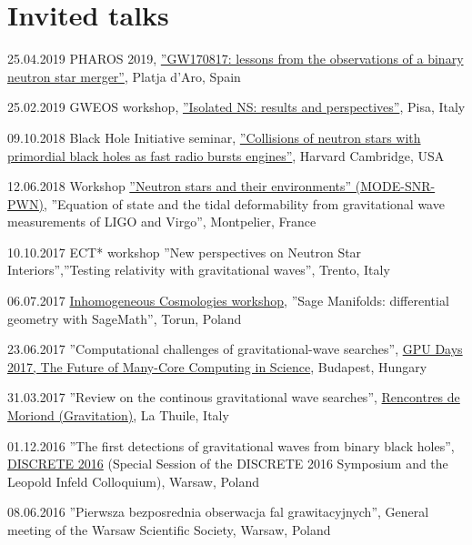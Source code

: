 \documentclass[]{friggeri-cv} %
\begin{document}
%  
\section{Invited talks}
\begin{entrylistoc}

\entrys 
{25.04.2019} 
{{PHAROS 2019}, \href{https://indico.ice.csic.es/event/12/page/12-final-program}{''GW170817: lessons from the observations of a binary neutron star merger''}, {Platja d'Aro, Spain}}  

\entrys 
{25.02.2019} 
{{GWEOS workshop}, \href{https://agenda.infn.it/event/17643/timetable/\#20190225}{''Isolated NS: results and perspectives''}, {Pisa, Italy}} 

\entrys 
{09.10.2018} 
{{Black Hole Initiative seminar}, \href{https://arxiv.org/abs/1704.05931}{''Collisions of neutron stars with primordial black holes as fast radio bursts engines''}, {Harvard Cambridge, USA}} 

\entrys
{12.06.2018}
{{Workshop \href{https://mode2018.sciencesconf.org/program}{''Neutron stars and their environments'' (MODE-SNR-PWN)}}, {''Equation of state and the tidal deformability from gravitational wave measurements of LIGO and Virgo'', Montpelier, France}}

\entrys 
{10.10.2017} 
{{ECT* workshop ''New perspectives on Neutron Star Interiors''},{''Testing relativity with gravitational waves'', Trento, Italy}} 

\entrys
{06.07.2017} 
{\href{https://cosmo.torun.pl/cosmotorun17.html}{Inhomogeneous Cosmologies workshop}, ''Sage Manifolds: differential geometry with SageMath'', Torun, Poland} 

\entrys 
{23.06.2017}
{''Computational challenges of gravitational-wave searches'', \href{http://gpuday.com}{GPU Days 2017, The Future of Many-Core Computing in Science}, Budapest, Hungary} 

\entrys 
{31.03.2017}
{''Review on the continous gravitational wave searches'', \href{http://moriond.in2p3.fr/grav/2017/program.php\#Friday}{Rencontres de Moriond (Gravitation)}, La Thuile, Italy}

\entrys 
{01.12.2016}
{''The first detections of gravitational waves from binary black holes'', \href{http://indico.fuw.edu.pl/sessionDisplay.py?contribId=57\&sessionId=44\&confId=46\#20161201}{DISCRETE 2016} (Special Session of the DISCRETE 2016 Symposium and the Leopold Infeld Colloquium), Warsaw, Poland}

\entrys 
{08.06.2016} 
{''Pierwsza bezposrednia obserwacja fal grawitacyjnych'', General meeting of the Warsaw Scientific Society, Warsaw, Poland} 


\end{entrylistoc}
\end{document}
